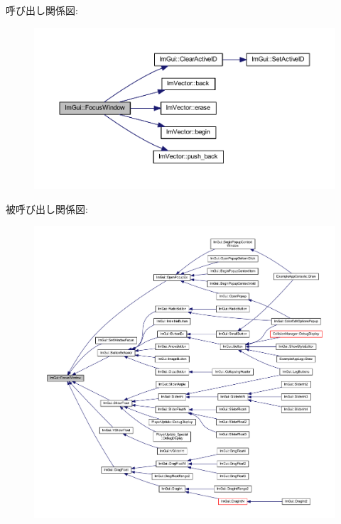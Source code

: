 呼び出し関係図\+:\nopagebreak
\begin{figure}[H]
\begin{center}
\leavevmode
\includegraphics[width=350pt]{namespace_im_gui_ade4c08e7e7ad7bbfa4835248f5f3a7c6_cgraph}
\end{center}
\end{figure}
被呼び出し関係図\+:\nopagebreak
\begin{figure}[H]
\begin{center}
\leavevmode
\includegraphics[width=350pt]{namespace_im_gui_ade4c08e7e7ad7bbfa4835248f5f3a7c6_icgraph}
\end{center}
\end{figure}
\mbox{\label{namespace_im_gui_a11837daee819fd90e17d80ab1eef1f99}} 
